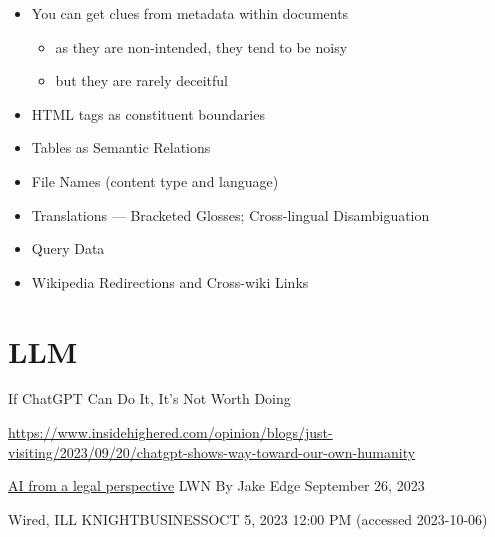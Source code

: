 \documentclass[a4paper,landscape,headrule,footrule,xetex]{foils}
\begin{document}
\begin{itemize}
\item You can get clues from metadata within documents
  \begin{itemize}
  \item as they are non-intended, they tend to be noisy
  \item but they are rarely deceitful
  \end{itemize}
\item HTML tags as constituent boundaries
\item Tables as Semantic Relations
\item File Names (content type and language)
\item Translations ---  Bracketed Glosses;  Cross-lingual Disambiguation
\item Query Data
\item Wikipedia Redirections and Cross-wiki Links
\end{itemize}

\section{LLM}


\begin{frame}{If ChatGPT Can Do It, It’s Not Worth Doing}

  \url{https://www.insidehighered.com/opinion/blogs/just-visiting/2023/09/20/chatgpt-shows-way-toward-our-own-humanity}

\href{https://lwn.net/Articles/945504/}{AI from a legal perspective} LWN By Jake Edge September 26, 2023

 Wired, ILL KNIGHTBUSINESSOCT 5, 2023 12:00 PM (accessed 2023-10-06)
  
\end{frame}

\end{document}
